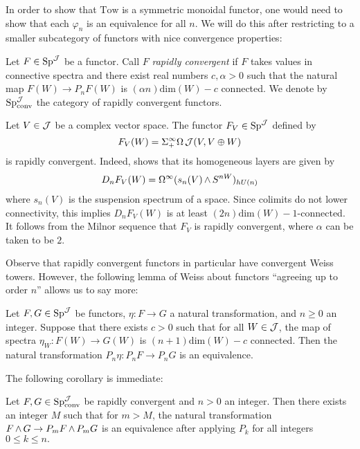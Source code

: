 In order to show that $\mathrm{Tow}$ is a symmetric monoidal functor, one would need to show that each $\varphi_n$ is an equivalence for all $n$.  We will do this after restricting to a smaller subcategory of functors with nice convergence properties:

\begin{dfn}
Let $F\in \operatorname{\mathrm{Sp}}^{\operatorname{\mathcal{J}}}$ be a functor.  Call $F$ \emph{rapidly convergent} if $F$ takes values in connective spectra and there exist real numbers $c,\alpha>0$ such that the natural map $F(W) \to P_nF(W)$ is $(\alpha n)\text{dim}(W) - c$ connected.  We denote by $\operatorname{\mathrm{Sp}}^{\operatorname{\mathcal{J}}}_{\text{conv}}$ the category of rapidly convergent functors.  
\end{dfn}

\begin{exm} \label{ex:aronefunctor}
Let $V\in \operatorname{\mathcal{J}}$ be a complex vector space.  
The functor $F_V\in \operatorname{\mathrm{Sp}}^{\operatorname{\mathcal{J}}}$ defined by $$F_V(W) = \Sigma^{\infty}_+ \Omega \operatorname{\mathcal{J}}(V, V\oplus W)$$ is rapidly convergent.  Indeed, \cite{Arone} shows that its homogeneous layers are given by $$D_nF_V(W) = \Omega^{\infty}(s_n(V) \operatorname{\wedge} S^{nW})_{hU(n)}$$ where $s_n(V)$ is the suspension spectrum of a space.  Since colimits do not lower connectivity, this implies $D_nF_V(W)$ is at least $(2n)\text{dim}(W)-1$-connected.  It follows from the Milnor sequence that $F_V$ is rapidly convergent, where $\alpha$ can be taken to be $2$.  
\end{exm}

Observe that rapidly convergent functors in particular have convergent Weiss towers.  However, the following lemma of Weiss about functors ``agreeing up to order $n$'' allows us to say more:

\begin{lem}\label{lem:ordernagree}
Let $F,G\in \operatorname{\mathrm{Sp}}^{\operatorname{\mathcal{J}}}$ be functors, $\eta: F\to G$ a natural transformation, and $n\geq 0$ an integer.  Suppose that there exists $c>0$ such that for all $W\in \operatorname{\mathcal{J}}$, the map of spectra $\eta_W: F(W) \to G(W)$ is $(n+1)\text{dim}(W) -c$ connected.  Then the natural transformation $P_n\eta: P_n F\to P_n G$ is an equivalence.  
\end{lem}

The following corollary is immediate:

\begin{cor} \label{cor:rapidconv}
Let $F,G\in \operatorname{\mathrm{Sp}}^{\operatorname{\mathcal{J}}}_{\text{conv}}$ be rapidly convergent and $n>0$ an integer.  Then there exists an integer $M$ such that for $m>M$, the natural transformation $F\operatorname{\wedge} G \to P_m F\operatorname{\wedge} P_m G$ is an equivalence after applying $P_k$ for all integers $0\leq k \leq n.$  
\end{cor}

